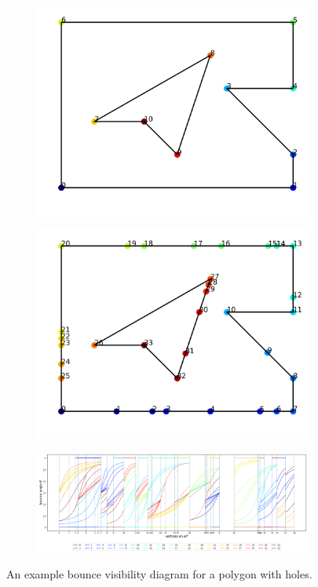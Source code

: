\documentclass[]{styles/svproc}  %
\begin{document}
\begin{figure}
\centering
\begin{subfigure}{0.5\textwidth}
\centering
\includegraphics[width=0.5\linewidth]{figures/median_holes.png}
\centering
\end{subfigure}%
\begin{subfigure}{0.5\textwidth}
\centering
\includegraphics[width=0.5\linewidth]{figures/median_holes_inserted.png}
\centering
\end{subfigure}
\begin{subfigure}{\textwidth}
\centering
\includegraphics[width=\linewidth]{figures/median_holes_bvd_all_inserted.png}
\centering
\end{subfigure}
\caption{An example bounce visibility diagram for a polygon with holes.}
\label{fig:bvd_holes}
\end{figure}
\end{document}
